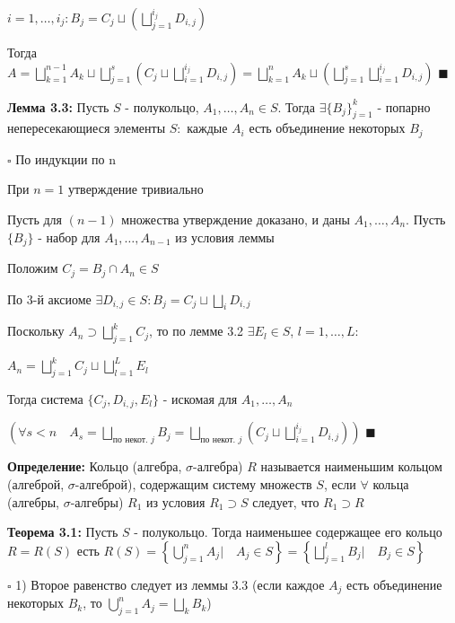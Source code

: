 \documentclass[a4paper]{report}
\begin{document}
 $i=1,\ldots,i_j\colon B_j=C_j\sqcup\left(\bigsqcup\limits_{j=1}^{i_j}
D_{i,j}\right)$

Тогда $A=\bigsqcup\limits_{k=1}^{n-1}A_k\sqcup\bigsqcup\limits_{j=1}^s\left(C_j\sqcup\bigsqcup\limits_{i=1}^{i_j} D_{i,j}\right)=
\bigsqcup\limits_{k=1}^n A_k\sqcup\left(\bigsqcup\limits_{j=1}^s\bigsqcup\limits_{i=1}^{i_j}D_{i,j}\right)$ $\blacksquare$
\bigskip

\noindent\textbf{Лемма 3.3:} Пусть $S$ - полукольцо, $A_1,\ldots,A_n\in S$. Тогда $\exists\{B_j\}_{j=1}^k$ - попарно 
непересекающиеся элементы $S\colon$ каждые $A_i$ есть объединение некоторых $B_j$

\noindent $\square$ По индукции по n

При $n=1$ утверждение тривиально

Пусть для $(n-1)$ множества утверждение доказано, и даны $A_1,\ldots,A_n$. Пусть $\{B_j\}$ - набор для $A_1,\ldots,A_{n-1}$
из условия леммы

Положим $C_j=B_j\cap A_n\in S$

По 3-й аксиоме $\exists D_{i,j}\in S\colon B_j=C_j\sqcup\bigsqcup\limits_i D_{i,j}$

Поскольку $A_n\supset\bigsqcup\limits_{j=1}^k C_j$, то по лемме 3.2 $\exists E_l\in S$, $l=1,\ldots,L\colon $

$A_n=\bigsqcup
\limits_{j=1}^k C_j\sqcup\bigsqcup\limits_{l=1}^L E_l$

Тогда система $\{C_j,D_{i,j},E_l\}$ - искомая для $A_1,\ldots,A_n$

$\left(\forall s<n\quad A_s=\bigsqcup\limits_{\text{по некот. }j}B_j=\bigsqcup\limits_{\text{по некот. }j}(C_j\sqcup
\bigsqcup\limits_{i=1}^{i_j}D_{i,j})\right)$ $\blacksquare$
\bigskip

\noindent\textbf{Определение:} Кольцо (алгебра, $\sigma$-алгебра) $R$ называется наименьшим кольцом (алгеброй, $\sigma$-алгеброй), 
содержащим систему множеств $S$, если $\forall$ кольца (алгебры, $\sigma$-алгебры) $R_1$ из условия $R_1\supset S$ 
следует, что $R_1\supset R$
\bigskip

\noindent\textbf{Теорема 3.1:} Пусть $S$ - полукольцо. Тогда наименьшее содержащее его кольцо $R=R(S)$ есть $R(S)=\left\{
\bigcup\limits_{j=1}^n A_j|\quad A_j\in S\right\}=\left\{\bigsqcup\limits_{j=1}^l B_j|\quad B_j\in S\right\}$

\noindent $\square$ 1) Второе равенство следует из леммы 3.3 (если каждое $A_j$ есть объединение некоторых $B_k$, то 
$\bigcup\limits_{j=1}^n A_j=\bigsqcup\limits_k B_k$)
\end{document}
